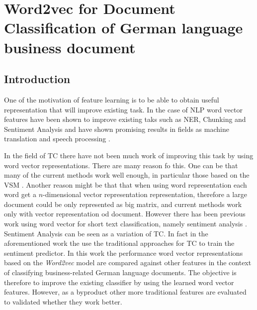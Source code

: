 \chapter{Word2vec for Document Classification of German language business document}
\label{chap:rel_word2vec_doc_classification}


\section{Introduction}
\label{sec:w2v4tc_intro}

One of the motivation of feature learning is to be able to
obtain useful representation that will improve existing task. In the case of
\ac{NLP} word vector features have been shown to improve existing taks such
as \ac{NER}, Chunking and Sentiment Analysis \cite{Turian:2010:WRS:1858681.1858721}
\cite{DBLP:journals/corr/abs-1103-0398}  and have shown promising results in
fields as machine translation and speech processing \cite{collobert:2008}
\cite{DBLP:journals/corr/MikolovLS13}.  

In the field of \ac{TC} there have
not been much work of improving this task by using word vector representations. There are many reason
fo this. One can be that many of the current methods work well enough, in particular those
based on the \ac{VSM} \cite{Sebastiani02}. Another reason might be that that
when using word representation each word get a $n$-dimensional vector
representation representation, therefore a large document could be only
represented as big matrix,  and current methods work only with vector
representation od document. However there has been previous work using word
vector for short text classification, namely sentiment analysis
\cite{maas2011learning} . Sentiment Analysis can be seen as a variation of
\ac{TC}. In fact in the aforementioned work the use the traditional
approaches for \ac{TC} to train the sentiment predictor.  In this work the
performance  word vector representations based on the \textit{Word2vec} model 
are compared against other features  in the context of classifying  business-related German language
documents. The objective is therefore to improve the existing classifier by
using the learned word vector features. However, as a byproduct other more
traditional features are evaluated to validated whether they work better. 

